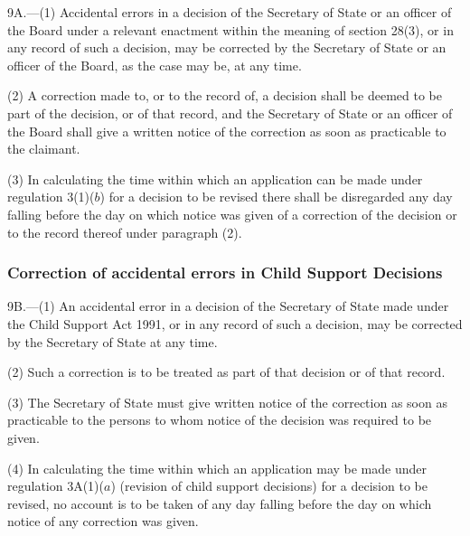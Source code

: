 \documentclass[12pt,a4paper]{article}
\begin{document}
9A.---(1)  Accidental errors in a decision of the Secretary of State or an officer of the Board under a relevant enactment within the meaning of section 28(3), or in any record of such a decision, may be corrected by the Secretary of State or an officer of the Board, as the case may be, at any time.

(2) A correction made to, or to the record of, a decision shall be deemed to be part of the decision, or of that record, and the Secretary of State or an officer of the Board shall give a written notice of the correction as soon as practicable to the claimant.

(3) In calculating the time within which an application can be made under regulation 3(1)($b$)  for a decision to be revised
there shall be disregarded any day falling before the day on which notice was given of a correction of the decision or to the record thereof under paragraph (2).


\subsubsection[9B. Correction of accidental errors in Child Support Decisions]{Correction of accidental errors in Child Support Decisions}

9B.—(1) An accidental error in a decision of the Secretary of State made under the Child Support Act 1991, or in any record of such a decision, may be corrected by the Secretary of State at any time.

(2) Such a correction is to be treated as part of that decision or of that record.

(3) The Secretary of State must give written notice of the correction as soon as practicable to the persons to whom notice of the decision was required to be given.

(4) In calculating the time within which an application may be made under regulation 3A(1)($a$)  (revision of child support decisions) for a decision to be revised, no account is to be taken of any day falling before the day on which notice of any correction was given.
\end{document}
